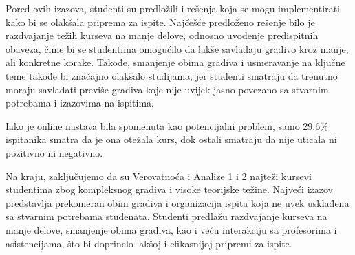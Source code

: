 \documentclass[a4paper]{article}
\begin{document}
Pored ovih izazova, studenti su predložili i rešenja koja se mogu implementirati kako bi se olakšala priprema za ispite. Najčešće predloženo rešenje bilo je razdvajanje težih kurseva na manje delove, odnosno uvođenje predispitnih obaveza, čime bi se studentima omogućilo da lakše savladaju gradivo kroz manje, ali konkretne korake. Takođe, smanjenje obima gradiva i usmeravanje na ključne teme takođe bi značajno olakšalo studijama, jer studenti smatraju da trenutno moraju savladati previše gradiva koje nije uvijek jasno povezano sa stvarnim potrebama i izazovima na ispitima.

Iako je online nastava bila spomenuta kao potencijalni problem, samo 29.6\% ispitanika smatra da je ona otežala kurs, dok ostali smatraju da nije uticala ni pozitivno ni negativno.

Na kraju, zaključujemo da su Verovatnoća i Analize 1 i 2 najteži kursevi studentima zbog kompleksnog gradiva i visoke teorijske težine. Najveći izazov predstavlja prekomeran obim gradiva i organizacija ispita koja ne uvek usklađena sa stvarnim potrebama studenata. Studenti predlažu razdvajanje kurseva na manje delove, smanjenje obima gradiva, kao i veću interakciju sa profesorima i asistencijama, što bi doprinelo lakšoj i efikasnijoj pripremi za ispite.

\vspace{7mm}
\end{document}
